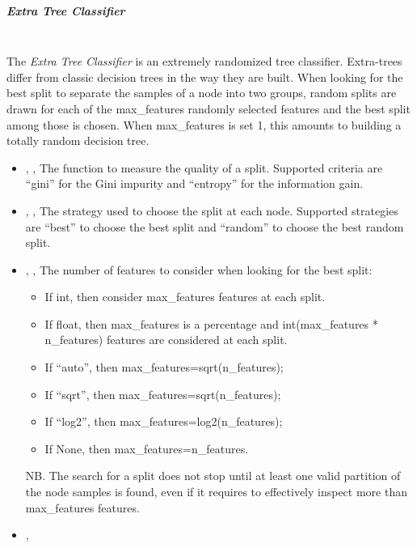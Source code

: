 \subparagraph{Extra Tree Classifier}
\mbox{}
\\The \textit{Extra Tree Classifier} is an extremely randomized tree classifier.
%
Extra-trees differ from classic decision trees in the way they are built.
%
When looking for the best split to separate the samples of a node into two
groups, random splits are drawn for each of the max\_features randomly selected
features and the best split among those is chosen.
%
When max\_features is set 1, this amounts to building a totally random decision
tree.
%
\begin{itemize}
  \item {}, ,
  The function to measure the quality of a split.
  Supported criteria are ``gini'' for the Gini impurity and ``entropy'' for the
  information gain.
  \item {}, ,
  The strategy used to choose the split at each node.
  Supported strategies are ``best'' to choose the best split and ``random'' to
  choose the best random split.
  \item {}, ,
  The number of features to consider when looking for the best split:
\begin{itemize}
    \item If int, then consider max\_features features at each split.
    \item If float, then max\_features is a percentage and int(max\_features *
    n\_features) features are considered at each split.
    \item If “auto”, then max\_features=sqrt(n\_features);
    \item If “sqrt”, then max\_features=sqrt(n\_features);
    \item If “log2”, then max\_features=log2(n\_features);
    \item If None, then max\_features=n\_features.
\end{itemize}
  NB.
  The search for a split does not stop until at least one valid partition of the
  node samples is found, even if it requires to effectively inspect more than
  max\_features features.
  \\
  \item {}, 
\end{itemize}
